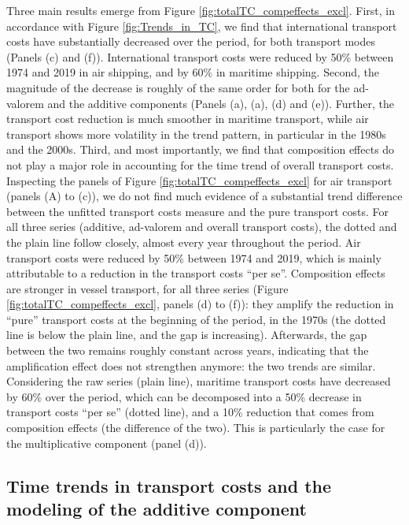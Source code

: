\documentclass[a4paper,11pt]{article}
\begin{document}
Three main results emerge from Figure \ref{fig:totalTC_compeffects_excl}.
First, in accordance with Figure \ref{fig:Trends_in_TC}, we find that international transport costs have substantially decreased over the period, for both transport modes (Panels (c) and (f)).
International transport costs were reduced by 50\% between 1974 and 2019 in air shipping, and by 60\% in maritime shipping. Second, the magnitude of the decrease is roughly of the same order for both for the ad-valorem and the additive components (Panels (a), (a), (d) and (e)).
Further, the transport cost reduction is much smoother in maritime transport, while air transport shows more volatility in the trend pattern, in particular in the 1980s and the 2000s.
Third, and most importantly, we find that composition effects do not play a major role in accounting for the time trend of overall transport costs.
Inspecting the panels of Figure \ref{fig:totalTC_compeffects_excl} for air transport (panels (A) to (c)), we do not find much evidence of a substantial trend difference between the unfitted transport costs measure and the pure transport costs.
For all three series (additive, ad-valorem and overall transport costs), the dotted and the plain line follow closely, almost every year throughout the period.
Air transport costs were reduced by 50\% between 1974 and 2019, which is mainly attributable to a reduction in the transport costs ``per se''.
Composition effects are stronger in vessel transport, for all three series (Figure \ref{fig:totalTC_compeffects_excl}, panels (d) to (f)): they amplify the reduction in ``pure'' transport costs at the beginning of the period, in the 1970s (the dotted line is below the plain line, and the gap is increasing). Afterwards, the gap between the two remains roughly constant across years, indicating that the amplification effect does not strengthen anymore: the two trends are similar.
Considering the raw series (plain line), maritime transport costs have decreased by 60\% over the period, which can be decomposed into a 50\% decrease in transport costs ``per se'' (dotted line), and a 10\% reduction that comes from composition effects (the difference of the two).
This is particularly the case for the multiplicative component (panel (d)).\smallskip


\subsection{Time trends in transport costs and the modeling of the additive component}
\end{document}
